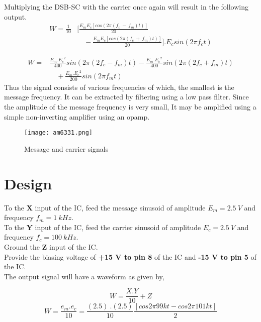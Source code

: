 Multiplying the DSB-SC with the carrier once again will result in the following output.
\begin{equation}
\begin{split}
W=\frac{1}{10} &[ \frac{E_mE_c [cos (2\pi (f_c\ -\ f_m)t)]}{20} \\
&\quad -\frac{E_mE_c[cos (2\pi (f_c\ +\ f_m)t)]}{20}].
 E_c sin(2\pi f_ct)
\end{split}
\end{equation}

\begin{equation}
\begin{split}
W=& \frac{E_m.{E_c}^2}{400}sin(2\pi (2f_c-f_m)t)  -  \frac{E_m.{E_c}^2}{400}sin(2\pi (2f_c+f_m)t)\\ 
&\quad +\frac{E_m.{E_c}^2}{200}sin(2\pi f_mt)
\end{split}
\end{equation}
Thus the signal consists of various frequencies of which, the smallest is the message frequency. It can be extracted by filtering using a low pass filter. Since the amplitude of the message frequency is very small, It may be amplified using a simple non-inverting amplifier using an opamp.

\begin{figure}[ht]
\texttt{[image: am6331.png]}
\caption{Message and carrier signals}
\label{msg633plot1}
\end{figure}
\section*{Design}

To the \textbf{X} input of the IC, feed the message sinusoid of amplitude $E_m=2.5\ V$ and frequency $f_m= 1\ kHz$.\\

To the \textbf{Y} input of the IC, feed the carrier sinusoid of amplitude $E_c=2.5\ V$ and frequency $f_c= 100\ kHz$.\\
Ground the \textbf{Z} input of the IC.\\
Provide the biasing voltage of \textbf{+15 V to pin 8} of the IC and \textbf{-15 V to pin 5} of the IC.\\

The output signal will have a waveform as given by,

\begin{equation}
W=\frac{X.Y}{10}+Z
\end{equation}
\begin{equation}
W=\frac{e_m.e_c}{10}=\frac{(2.5) \ .(2.5)}{10}\frac{[cos 2\pi99kt-cos 2\pi101kt]}{2}
\end{equation}

